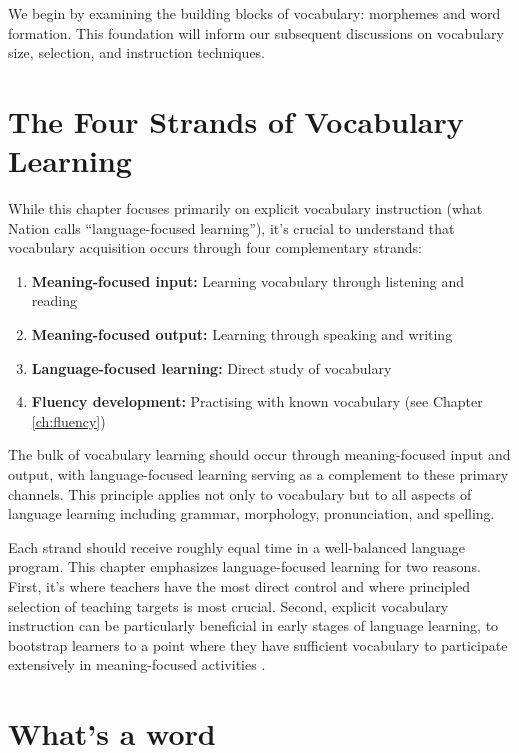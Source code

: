 We begin by examining the building blocks of vocabulary: morphemes and word formation. This foundation will inform our subsequent discussions on vocabulary size, selection, and instruction techniques.

\section{The Four Strands of Vocabulary Learning} \label{sec:four-strands}

While this chapter focuses primarily on explicit vocabulary instruction (what Nation calls ``language-focused learning''), it's crucial to understand that vocabulary acquisition occurs through four complementary strands:

\begin{enumerate}
    \item \textbf{Meaning-focused input:} Learning vocabulary through listening and reading
    \item \textbf{Meaning-focused output:} Learning through speaking and writing
    \item \textbf{Language-focused learning:} Direct study of vocabulary
    \item \textbf{Fluency development:} Practising with known vocabulary (see Chapter \ref{ch:fluency})
\end{enumerate}

The bulk of vocabulary learning should occur through meaning-focused input and output, with language-focused learning serving as a complement to these primary channels. This principle applies not only to vocabulary but to all aspects of language learning including grammar, morphology, pronunciation, and spelling.

Each strand should receive roughly equal time in a well-balanced language program. This chapter emphasizes language-focused learning for two reasons. First, it's where teachers have the most direct control and where principled selection of teaching targets is most crucial. Second, explicit vocabulary instruction can be particularly beneficial in early stages of language learning, to bootstrap learners to a point where they have sufficient vocabulary to participate extensively in meaning-focused activities \citep[CITATION NEEDED]{}.

\section{What's a word}\label{sec:what-is-a-word}

